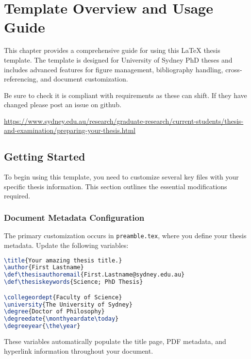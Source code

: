 \chapter{Template Overview and Usage Guide}
\label{chap:overview}
\newrefsegment
\glsresetall

This chapter provides a comprehensive guide for using this LaTeX thesis template. The template is designed for University of Sydney PhD theses and includes advanced features for figure management, bibliography handling, cross-referencing, and document customization.

Be sure to check it is compliant with requirements as these can shift. If they have changed please post an issue on github.

\url{https://www.sydney.edu.au/research/graduate-research/current-students/thesis-and-examination/preparing-your-thesis.html}

\section{Getting Started}
\label{sect:getting-started}

To begin using this template, you need to customize several key files with your specific thesis information. This section outlines the essential modifications required.

\subsection{Document Metadata Configuration}
\label{sect:metadata-config}

The primary customization occurs in \texttt{preamble.tex}, where you define your thesis metadata. Update the following variables:

\begin{lstlisting}[language=TeX,caption={Document metadata in preamble.tex}]
% Document setup using dynamic variables
\title{Your amazing thesis title.}
\author{First Lastname}
\def\thesisauthoremail{First.Lastname@sydney.edu.au}
\def\thesiskeywords{Science; PhD Thesis}

\collegeordept{Faculty of Science}
\university{The University of Sydney}
\degree{Doctor of Philosophy}
\degreedate{\monthyeardate\today}
\degreeyear{\the\year}
\end{lstlisting}

These variables automatically populate the title page, PDF metadata, and hyperlink information throughout your document.

